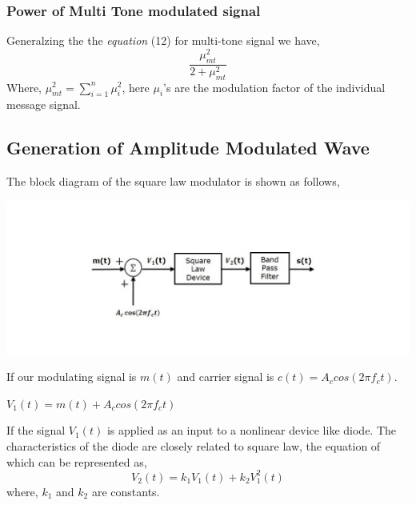 \documentclass[12pt,a4paper]{article}%
\begin{document}
\begin{flushleft}
\begin{flushleft}
			\subsubsection{Power of Multi Tone modulated signal}
			\begin{flushleft}
				Generalzing the the \textit{equation} (12) for multi-tone signal we have,
				\begin{equation}
				\dfrac{\mu_{mt}^2}{2+\mu_{mt}^2}
				\end{equation}
				Where, $\mu_{mt}^{2}=\sum\limits_{i=1}^n \mu_{i}^{2}$, here $\mu_i$'s are the modulation factor of the individual message signal.
				
			\end{flushleft}
		\end{flushleft}
	
		\subsection{Generation of Amplitude Modulated Wave}
		\begin{flushleft}
			The block diagram of the square law modulator is shown as follows,\\
			\begin{center}
				\includegraphics[width=0.99 \textwidth]{./images/Square Law modulator.png}
			\end{center}
			If our modulating signal is $m(t)$ and carrier signal is $c(t)=A_c cos(2 \pi f_c t)$.\\
			\begin{center}
				$V_1 (t) = m(t) + A_c cos(2 \pi f_c t) $
			\end{center}
			If the signal $V_1 (t)$ is applied as an input to a nonlinear device like diode. The characteristics of the diode are closely related to square law, the equation of which can be represented as,
			\begin{equation}
				V_2 (t) = k_1 V_1 (t) + k_2 V_1 ^ {2} (t)
			\end{equation}
			where, $k_1$ and $k_2$ are constants.\\

\end{flushleft}
\end{flushleft}
\end{document}
